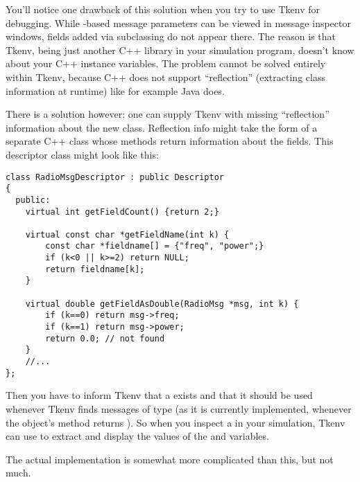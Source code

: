 
You'll notice one drawback of this solution when you try to use
Tkenv for debugging. While -based message parameters can be viewed in
message inspector windows, fields added via subclassing do not appear
there. The reason is that Tkenv, being just another C++ library in your
simulation program, doesn't know about your C++ instance variables.
The problem cannot be solved entirely within Tkenv, because C++ does not
support ``reflection'' (extracting class information at runtime)
like for example Java does.

There is a solution however: one can supply Tkenv with missing ``reflection''
information about the new class. Reflection info might take the form of
a separate C++ class whose methods return information about the
 fields. This descriptor class might look like this:

\begin{verbatim}
class RadioMsgDescriptor : public Descriptor
{
  public:
    virtual int getFieldCount() {return 2;}

    virtual const char *getFieldName(int k) {
        const char *fieldname[] = {"freq", "power";}
        if (k<0 || k>=2) return NULL;
        return fieldname[k];
    }

    virtual double getFieldAsDouble(RadioMsg *msg, int k) {
        if (k==0) return msg->freq;
        if (k==1) return msg->power;
        return 0.0; // not found
    }
    //...
};
\end{verbatim}

Then you have to inform Tkenv that a  exists and that it
should be used whenever Tkenv finds messages of type  (as it is
currently implemented, whenever the object's  method returns
). So when you inspect a  in your simulation, Tkenv
can use  to extract and display the values of
the  and  variables.

The actual implementation is somewhat more complicated than this, but not
much.

